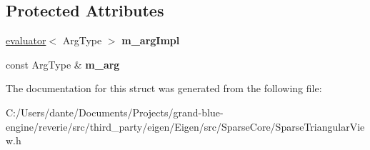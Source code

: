 \subsection*{Protected Attributes}
\begin{DoxyCompactItemize}
\item 
\mbox{\label{struct_eigen_1_1internal_1_1unary__evaluator_3_01_triangular_view_3_01_arg_type_00_01_mode_01_4_00_01_iterator_based_01_4_aa410a4fe113e875786884cfa5864c8ff}} 
\mbox{\hyperlink{struct_eigen_1_1internal_1_1evaluator}{evaluator}}$<$ Arg\+Type $>$ {\bfseries m\+\_\+arg\+Impl}
\item 
\mbox{\label{struct_eigen_1_1internal_1_1unary__evaluator_3_01_triangular_view_3_01_arg_type_00_01_mode_01_4_00_01_iterator_based_01_4_a187debbdeb4f1b93a26d2073e5fd5779}} 
const Arg\+Type \& {\bfseries m\+\_\+arg}
\end{DoxyCompactItemize}


The documentation for this struct was generated from the following file\+:\begin{DoxyCompactItemize}
\item 
C\+:/\+Users/dante/\+Documents/\+Projects/grand-\/blue-\/engine/reverie/src/third\+\_\+party/eigen/\+Eigen/src/\+Sparse\+Core/Sparse\+Triangular\+View.\+h\end{DoxyCompactItemize}
